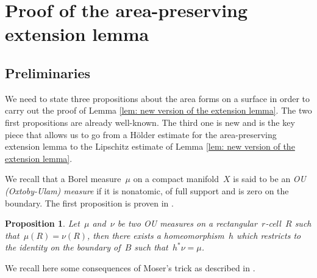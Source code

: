 \documentclass[10pt]{amsart}
\newtheorem{prop}{Proposition}[section]
\begin{document}

\section{Proof of the area-preserving extension lemma}\label{sec: pf of the area-preserving extension lemma}


\subsection{Preliminaries}\label{subsec: preliminary}

We need to state three propositions about the area forms on a surface in order to carry out the proof of Lemma \ref{lem: new version of the extension lemma}. The two first propositions are already well-known. The third one is new and is the key piece that allows us to go from a Hölder estimate for the area-preserving extension lemma to the Lipschitz estimate of Lemma \ref{lem: new version of the extension lemma}.

We recall that a Borel measure~$\mu$ on a compact manifold~$X$ is said to be an \textit{OU (Oxtoby-Ulam) measure} if it is nonatomic, of full support and is zero on the boundary. The first proposition is proven in \cite{OU}.

\begin{prop}\label{prop: OU proposition}
Let~$\mu$ and~$\nu$ be two OU measures on a rectangular~$r$-cell~$R$ such that~$\mu(R)=\nu(R)$, then there exists a homeomorphism~$h$ which restricts to the identity on the boundary of~$B$ such that~$h^*\nu=\mu$.
\end{prop}

We recall here some consequences of Moser's trick \cite{Moser} as described in \cite[Section 3.4.1]{Seyfaddini}.
\end{document}

